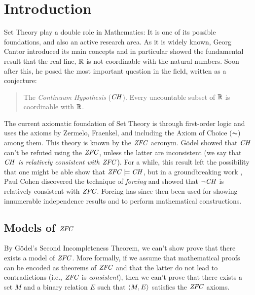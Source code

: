 \section{Introduction}\label{sec:introduction}
Set Theory play a double role in Mathematics: It is one of its
possible foundations, and also an active research area.
%
As it is widely known, Georg Cantor introduced its main concepts and in
particular showed the fundamental result that the real line, $\mathbb{R}$  is not
coordinable with the natural numbers. Soon after this, he posed the
most important question in the field, written as a conjecture:
\begin{quote}
  The \emph{Continuum Hypothesis} ($\mathit{CH}$). Every uncountable subset of $\mathbb{R}$ is
  coordinable with $\mathbb{R}$.
\end{quote}

The current  axiomatic foundation of Set Theory is through 
first-order logic and uses the axioms by  Zermelo, Fraenkel, and
including the Axiom of Choice ($\AC$) among them. This theory is
known by the $\mathit{ZFC}$ acronym. G\"odel showed that $\mathit{CH}$ can't be
refuted using the $\mathit{ZFC}$, unless the latter are inconsistent (we say
that \emph{$\mathit{CH}$ is relatively 
  consistent with  $\mathit{ZFC}$}). For a while, this result left the
possibility that one might be able show that $\mathit{ZFC}\models \mathit{CH}$, but in
a groundbreaking work \cite{Cohen-CH-PNAS}, Paul Cohen discovered the
technique of 
\emph{forcing} and showed that $\neg\mathit{CH}$ is relatively consistent with
$\mathit{ZFC}$. Forcing has since then been used for showing innumerable
independence results and to perform mathematical constructions.


\subsection{Models of $\mathit{ZFC}$}
By G\"odel's Second Incompleteness Theorem, we can't show prove that
there exists a model of $\mathit{ZFC}$. More formally, if we assume that
mathematical proofs can be encoded as theorems of $\mathit{ZFC}$ and that
the latter do not lead to contradictions (i.e., $\mathit{ZFC}$ is
\emph{consistent}), then we can't prove that there exists a set $M$
and a binary relation $E$ such that $\langle M,E\rangle$ satisfies the $\mathit{ZFC}$
axioms.

